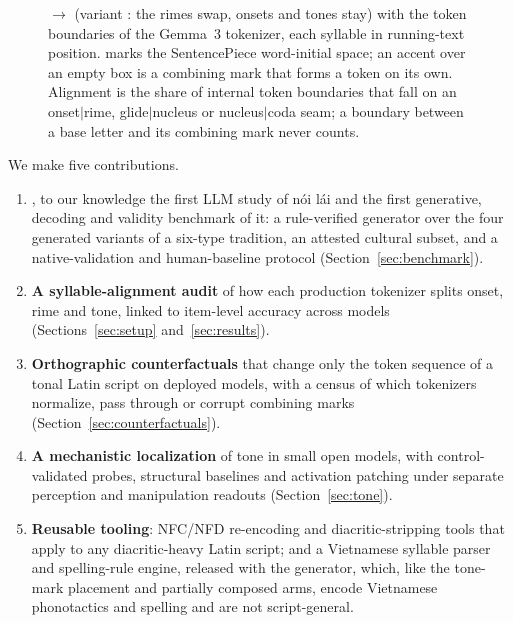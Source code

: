 
\begin{figure}[t]
  \centering
  \small
  
  \caption{ $\rightarrow$  (variant : the rimes swap, onsets and tones stay) with the token boundaries of the Gemma~3 tokenizer, each syllable in running-text position. \protect\tokspace{} marks the SentencePiece word-initial space; an accent over an empty box is a combining mark that forms a token on its own. Alignment is the share of internal token boundaries that fall on an onset$|$rime, glide$|$nucleus or nucleus$|$coda seam; a boundary between a base letter and its combining mark never counts. \figtokensnote{} }
  \label{fig:tokens}
\end{figure}

We make five contributions.
\begin{enumerate}[nosep,leftmargin=*]
  \item \textbf{\noilai{}}, to our knowledge the first LLM study of nói lái and the first generative, decoding and validity benchmark of it: a rule-verified generator over the four generated variants of a six-type tradition, an attested cultural subset, and a native-validation and human-baseline protocol (Section~\ref{sec:benchmark}).
  \item \textbf{A syllable-alignment audit} of how each production tokenizer splits onset, rime and tone, linked to item-level accuracy across  models (Sections~\ref{sec:setup} and~\ref{sec:results}).
  \item \textbf{Orthographic counterfactuals} that change only the token sequence of a tonal Latin script on deployed models, with a census of which tokenizers normalize, pass through or corrupt combining marks (Section~\ref{sec:counterfactuals}).
  \item \textbf{A mechanistic localization} of tone in small open models, with control-validated probes, structural baselines and activation patching under separate perception and manipulation readouts (Section~\ref{sec:tone}).
  \item \textbf{Reusable tooling}: NFC/NFD re-encoding and diacritic-stripping tools that apply to any diacritic-heavy Latin script; and a Vietnamese syllable parser and spelling-rule engine, released with the generator, which, like the tone-mark placement and partially composed arms, encode Vietnamese phonotactics and spelling and are not script-general.
\end{enumerate}

